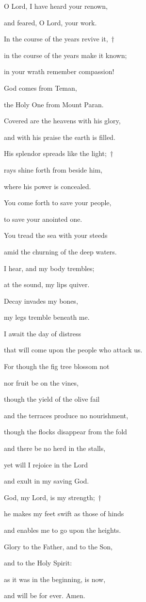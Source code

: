 \noindent O Lord, I have heard your renown,~\GreStar{}~\nopagebreak

and feared, O Lord, your work.

\noindent In the course of the years revive it,~†~\nopagebreak

in the course of the years make it known;~\GreStar{}~\nopagebreak

in your wrath remember compassion!

\noindent God comes from Teman,~\GreStar{}~\nopagebreak

the Holy One from Mount Paran.

\noindent Covered are the heavens with his glory,~\GreStar{}~\nopagebreak

and with his praise the earth is filled.

\noindent His splendor spreads like the light;~†~\nopagebreak

rays shine forth from beside him,~\GreStar{}~\nopagebreak

where his power is concealed.

\noindent You come forth to save your people,~\GreStar{}~\nopagebreak

to save your anointed one.

\noindent You tread the sea with your steeds~\GreStar{}~\nopagebreak

amid the churning of the deep waters.

\noindent I hear, and my body trembles;~\GreStar{}~\nopagebreak

at the sound, my lips quiver.

\noindent Decay invades my bones,~\GreStar{}~\nopagebreak

my legs tremble beneath me.

\noindent I await the day of distress~\GreStar{}~\nopagebreak

that will come upon the people who attack us.

\noindent For though the fig tree blossom not~\GreStar{}~\nopagebreak

nor fruit be on the vines,

\noindent though the yield of the olive fail~\GreStar{}~\nopagebreak

and the terraces produce no nourishment,

\noindent though the flocks disappear from the fold~\GreStar{}~\nopagebreak

and there be no herd in the stalls,

\noindent yet will I rejoice in the Lord~\GreStar{}~\nopagebreak

and exult in my saving God.

\noindent God, my Lord, is my strength;~†~\nopagebreak

he makes my feet swift as those of hinds~\GreStar{}~\nopagebreak

and enables me to go upon the heights.

\noindent Glory to the Father, and to the Son,~\GreStar{}~\nopagebreak

and to the Holy Spirit:

\noindent as it was in the beginning, is now,~\GreStar{}~\nopagebreak

and will be for ever. Amen.

